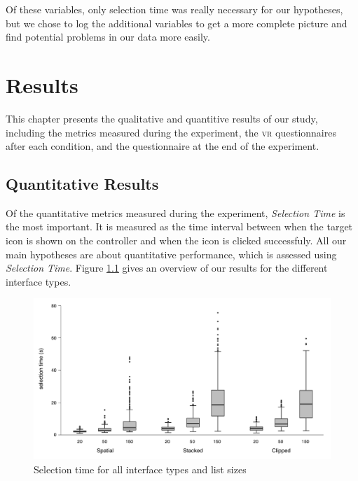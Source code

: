\documentclass[nobib]{tufte-book} %
\begin{document}
Of these variables, only selection time was really necessary for our hypotheses, but we chose to log the additional variables to get a more complete picture and find potential problems in our data more easily.



\chapter{Results}
\label{ch:results}

This chapter presents the qualitative and quantitive results of our study, including the metrics measured during the experiment, the \textsc{vr} questionnaires after each condition, and the questionnaire at the end of the experiment.

\section{Quantitative Results}
Of the quantitative metrics measured during the experiment, \emph{Selection Time} is the most important. It is measured as the time interval between when the target icon is shown on the controller and when the icon is clicked successfuly. All our main hypotheses are about quantitative performance, which is assessed using \emph{Selection Time}. Figure \ref{fig:all-durations-chart} gives an overview of our results for the different interface types.

\begin{figure}[h]
  \includegraphics[width=\linewidth]{all-durations.pdf}
  \caption{Selection time for all interface types and list sizes}
  \label{fig:all-durations-chart}
\end{figure}
\end{document}
